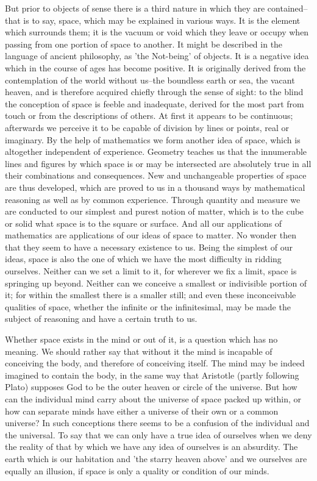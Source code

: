 But prior to objects of sense there is a third nature in which they
are contained--that is to say, space, which may be explained in various
ways. It is the element which surrounds them; it is the vacuum or void
which they leave or occupy when passing from one portion of space to
another. It might be described in the language of ancient philosophy, as
'the Not-being' of objects. It is a negative idea which in the course
of ages has become positive. It is originally derived from the
contemplation of the world without us--the boundless earth or sea, the
vacant heaven, and is therefore acquired chiefly through the sense of
sight: to the blind the conception of space is feeble and inadequate,
derived for the most part from touch or from the descriptions of others.
At first it appears to be continuous; afterwards we perceive it to be
capable of division by lines or points, real or imaginary. By the
help of mathematics we form another idea of space, which is altogether
independent of experience. Geometry teaches us that the innumerable
lines and figures by which space is or may be intersected are absolutely
true in all their combinations and consequences. New and unchangeable
properties of space are thus developed, which are proved to us in a
thousand ways by mathematical reasoning as well as by common experience.
Through quantity and measure we are conducted to our simplest and purest
notion of matter, which is to the cube or solid what space is to
the square or surface. And all our applications of mathematics are
applications of our ideas of space to matter. No wonder then that they
seem to have a necessary existence to us. Being the simplest of our
ideas, space is also the one of which we have the most difficulty in
ridding ourselves. Neither can we set a limit to it, for wherever we
fix a limit, space is springing up beyond. Neither can we conceive a
smallest or indivisible portion of it; for within the smallest there
is a smaller still; and even these inconceivable qualities of space,
whether the infinite or the infinitesimal, may be made the subject of
reasoning and have a certain truth to us.

Whether space exists in the mind or out of it, is a question which has
no meaning. We should rather say that without it the mind is incapable
of conceiving the body, and therefore of conceiving itself. The mind may
be indeed imagined to contain the body, in the same way that Aristotle
(partly following Plato) supposes God to be the outer heaven or circle
of the universe. But how can the individual mind carry about the
universe of space packed up within, or how can separate minds have
either a universe of their own or a common universe? In such conceptions
there seems to be a confusion of the individual and the universal. To
say that we can only have a true idea of ourselves when we deny the
reality of that by which we have any idea of ourselves is an absurdity.
The earth which is our habitation and 'the starry heaven above' and
we ourselves are equally an illusion, if space is only a quality or
condition of our minds.

